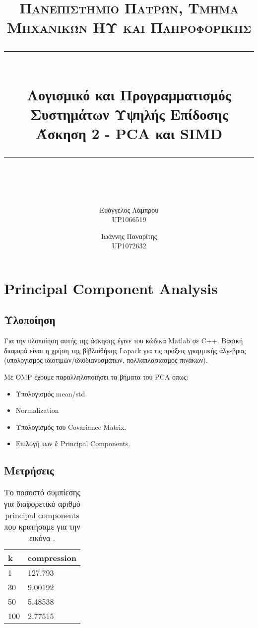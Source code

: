 \documentclass[11pt]{scrartcl} %
\title{	
	\normalfont\normalsize
	\textsc{Πανεπιστήμιο Πατρών, Τμήμα Μηχανικών ΗΥ και Πληροφορικής}\\ %
	\vspace{25pt} %
	\rule{\linewidth}{0.5pt}\\ %
	\vspace{20pt} %
	{\LARGE Λογισμικό και Προγραμματισμός Συστημάτων Υψηλής Επίδοσης\\ Άσκηση 2 - PCA και SIMD}\\ %
	\vspace{12pt} %
	\rule{\linewidth}{2pt}\\ %
	\vspace{12pt} %
}
\author{Ευάγγελος Λάμπρου \\UP1066519 \and Ιωάννης Παναρίτης \\UP1072632} %
\date{} %
\begin{document}
\maketitle 

\section{Principal Component Analysis}

\subsection{Υλοποίηση}

Για την υλοποίηση αυτής της άσκησης έγινε  του κώδικα Matlab σε C++.
Βασική διαφορά είναι η χρήση της βιβλιοθήκης Lapack για τις πράξεις γραμμικής άλγεβρας (υπολογισμός ιδιοτιμών/ιδιοδιανυσμάτων, πολλαπλασιασμός πινάκων).

Με OMP έχουμε παραλληλοποιήσει τα βήματα του PCA όπως: 

\begin{itemize}
    \item Υπολογισμός mean/std 
    \item Normalization
    \item Υπολογισμός του Covariance Matrix.
    \item Επιλογή των $k$ Principal Components.
\end{itemize}

\subsection{Μετρήσεις}

\begin{table}[H]
    \centering
    \begin{tabular}{|l|l|}
    \hline
        \textbf{k} & \textbf{compression} \\ \hline
        1 & 127.793 \\ \hline
        30 & 9.00192 \\ \hline
        50 & 5.48538 \\ \hline
        100 & 2.77515 \\ \hline
    \end{tabular}
    \caption{Το ποσοστό συμπίεσης για διαφορετικό αριθμό principal components που κρατήσαμε για την εικόνα .}
\end{table}
\end{document}

